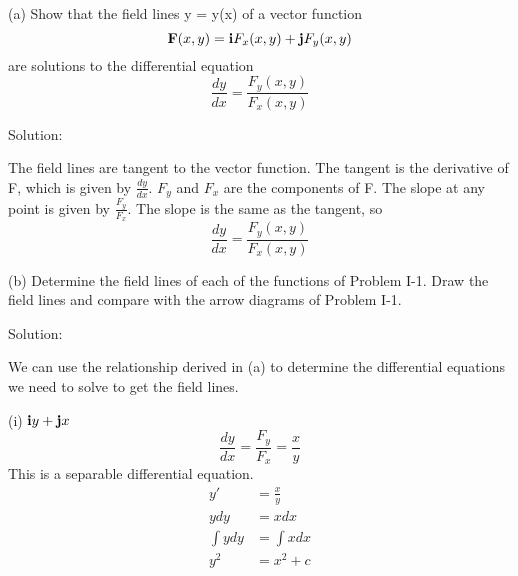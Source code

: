 \documentclass{article}
\begin{document}
\begin{enumerate}
    (a) Show that the field lines y = y(x) of a vector function
    \[ \textbf{F}(x,y) = \textbf{i}F_x(x,y) + \textbf{j}F_y(x,y) \]
    are solutions to the differential equation
    \[ \frac{dy}{dx} = \frac{F_y(x,y)}{F_x(x,y)} \]

    Solution:

    The field lines are tangent to the vector function. The tangent is the derivative of
    F, which is given by $\frac{dy}{dx}$. $F_y$ and $F_x$ are the components of F. The
    slope at any point is given by $\frac{F_y}{F_x}$. The slope is the same as the tangent,
    so
    \[ \frac{dy}{dx} = \frac{F_y(x,y)}{F_x(x,y)} \]

    (b) Determine the field lines of each of the functions of Problem I-1. Draw the
    field lines and compare with the arrow diagrams of Problem I-1.

    Solution:

    We can use the relationship derived in (a) to determine the differential equations
    we need to solve to get the field lines.

    (i) $\textbf{i}y + \textbf{j}x$
    \[ \frac{dy}{dx} = \frac{F_y}{F_x} = \frac{x}{y} \]
    This is a separable differential equation.
    \begin{align*}
        y' &= \frac{x}{y} \\
        ydy &= xdx \\
        \int{ydy} &= \int{xdx} \\
        y^2 &= x^2 + c
    \end{align*}


\end{enumerate}
\end{document}

